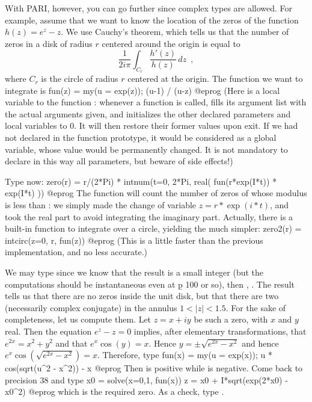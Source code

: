 With PARI, however, you can go further since complex types are allowed.
For example, assume that we want to know the location of the zeros of the
function $h(z)=e^z-z$. We use Cauchy's theorem, which tells us that the
number of zeros in a disk of radius $r$ centered around the origin is
equal to
$$\dfrac{1}{2i\pi}\int_{C_r}\dfrac{h'(z)}{h(z)}\,dz\enspace,$$
where $C_r$ is the circle of radius $r$ centered at the origin.
The function we want to integrate is
\bprog
  fun(z) = my(u = exp(z)); (u-1) / (u-z)
@eprog\noindent
(Here  is a local variable to the function : whenever
a function is called,  fills its argument list with the actual arguments
given, and initializes the other declared parameters and local variables to
0. It will then restore their former values upon exit. If we had not declared
 in the function prototype, it would be considered as a global
variable, whose value would be permanently changed. It is not mandatory to
declare in this way all parameters, but beware of side effects!)

Type now:
\bprog
  zero(r) = r/(2*Pi) * intnum(t=0, 2*Pi, real( fun(r*exp(I*t)) * exp(I*t) ))
@eprog
The function  will count the number of zeros of 
whose modulus is less than : we simply made the change of variable
$z = r*\exp(i*t)$, and took the real part to avoid integrating the
imaginary part. Actually, there is a built-in function 
to integrate over a circle, yielding the much simpler:
\bprog
  zero2(r) = intcirc(z=0, r, fun(z))
@eprog
(This is a little faster than the previous implementation, and no less
accurate.)

We may type  since we know that the result is a small integer
(but the computations should be instantaneous even at \b{p} 100 or so),
then , . The result tells us that there are
no zeros inside the unit disk, but that there are two (necessarily
complex conjugate) in the annulus $1<|z|<1.5$. For the sake of
completeness, let us compute them. Let $z = x+iy$ be such a zero, with
$x$ and $y$ real. Then the equation $e^z-z=0$ implies, after elementary
transformations, that $e^{2x}=x^2+y^2$ and that $e^x\cos(y)=x$. Hence
$y=\pm\sqrt{e^{2x}-x^2}$ and hence $e^x\cos(\sqrt{e^{2x}-x^2})=x$.
Therefore, type
\bprog
  fun(x) = my(u = exp(x)); u * cos(sqrt(u^2 - x^2)) - x
@eprog\noindent
Then  is positive while  is negative. Come
back to precision 38 and type
\bprog
  x0 = solve(x=0,1, fun(x))
  z = x0 + I*sqrt(exp(2*x0) - x0^2)
@eprog\noindent
which is the required zero. As a check, type .

